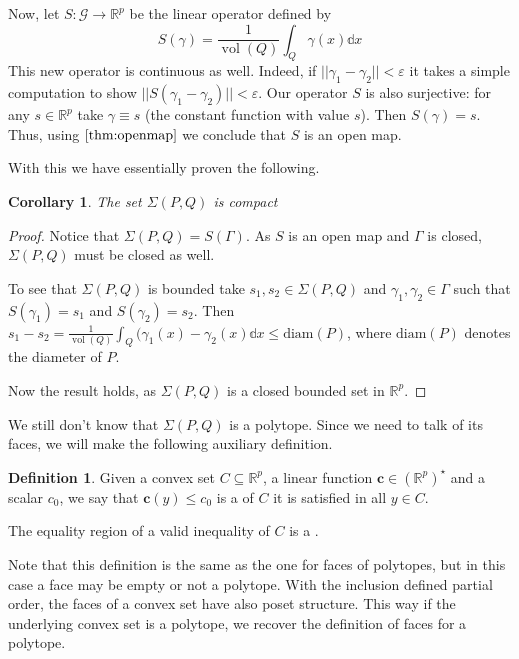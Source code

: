 \documentclass[10pt,a4paper]{article}
\let\emph\relax %
\DeclareMathOperator{\vol}{vol}
\newcommand{\RR}{\mathbb{R}}
\newcommand{\eps}{\varepsilon}
\theoremstyle{plain}
\newtheorem{corollary}{Corollary}
\theoremstyle{remark}
\theoremstyle{definition}
\newtheorem{definition}{Definition}
\begin{document}
Now, let $S: \mathcal{G}\rightarrow \RR^p$ be the linear operator defined by
\begin{equation*} 
	S(\gamma)= \frac{1}{\vol(Q)} \int_Q \gamma(x) \mathbb{d}x
\end{equation*}
This new operator is continuous as well. 
Indeed, if $||\gamma_1-\gamma_2||< \eps$ it takes a simple computation to show 
$||S(\gamma_1-\gamma_2)||< \eps$.
Our operator $S$ is also surjective: 
for any $s\in \RR^p$ take $\gamma\equiv s$ 
(the constant function with value $s$).
Then $S(\gamma)=s$. 
Thus, using $\cref{thm:openmap}$ we conclude that $S$ is an open map. \par
With this we have essentially proven the following.

\begin{corollary} 
	The set $\Sigma(P,Q)$ is compact
\end{corollary}
\begin{proof}
	Notice that $\Sigma(P,Q)= S(\Gamma)$. 
	As $S$ is an open map and $\Gamma$ is closed,
	 $\Sigma(P,Q)$ must be closed as well.\par
	To see that $\Sigma(P,Q)$ is bounded take 
	$s_1, s_2\in \Sigma(P,Q)$ and
	$\gamma_1,\gamma_2\in \Gamma$ 
	such that $S(\gamma_1)=s_1$ and $S(\gamma_2)=s_2$.
	Then 
	$s_1-s_2 = 
	\frac{1}{\vol(Q)} \int_Q (\gamma_1(x)-\gamma_2(x) \mathbb{d}x\leq \mathrm{diam}(P)$, 
	where $\mathrm{diam}(P)$ denotes the diameter of $P$. \par
	Now the result holds, as $\Sigma(P,Q)$ is a closed bounded set in $\RR^p$.
\end{proof}


We still don't know that $\Sigma(P,Q)$ is a polytope. 
Since we need to talk of its faces, we will make the
following auxiliary definition.

\begin{definition}
    \label{def:notYetKnownToBeFaces}
    Given a convex set $C\subseteq\RR^p$, a linear function $\bm{c}\in (\RR^p)^\star$ and a scalar $c_0$,
    we say that $\bm{c}(y) \leq c_0$ is a \emph{valid inequality} of $C$ it is satisfied in all $y\in C$.\par    
    The equality region of a valid inequality of $C$ is a \emph{face}.  
\end{definition}
Note that this definition is the same as the one for faces of polytopes,
but in this case a face may be empty or not a polytope.
With the inclusion defined partial order, 
the faces of a convex set have also poset structure.
This way if the underlying convex set is a polytope, 
we recover the definition of faces for a polytope.
\end{document}
